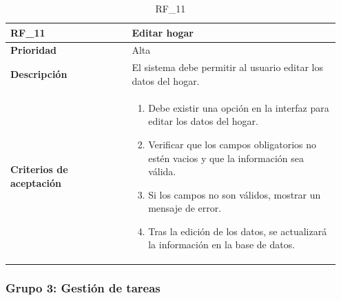 \begin{table}[htb!]
    \begin{tabular}{|p{0.35\linewidth}|p{0.6\linewidth}|}
        \hline
        \rowcolor[HTML]{C0C0C0}  
        \textbf{RF\_11} & \textbf{Editar hogar} \\ 
        \hline
        \textbf{Prioridad} & Alta \\ 
        \hline
        \textbf{Descripción} & El sistema debe permitir al usuario editar los datos del hogar. \\ 
        \hline
        \vspace{0.5mm}
        \textbf{Criterios de aceptación} & 
        \begin{minipage}[t]{0.9\linewidth}
            \begin{enumerate}
                \item Debe existir una opción en la interfaz para editar los datos del hogar.
                \item Verificar que los campos obligatorios no estén vacios y que la información sea válida.
                \item Si los campos no son válidos, mostrar un mensaje de error.
                \item Tras la edición de los datos, se actualizará la información en la base de datos.
            \end{enumerate}
            \vspace{2mm}
        \end{minipage} \\ 
        \hline
    \end{tabular}
    \caption{RF\_11}
    \label{req:RF11}
\end{table}


\clearpage

\subsubsection{Grupo 3: Gestión de tareas}
\label{subsubsec:grupo3}

